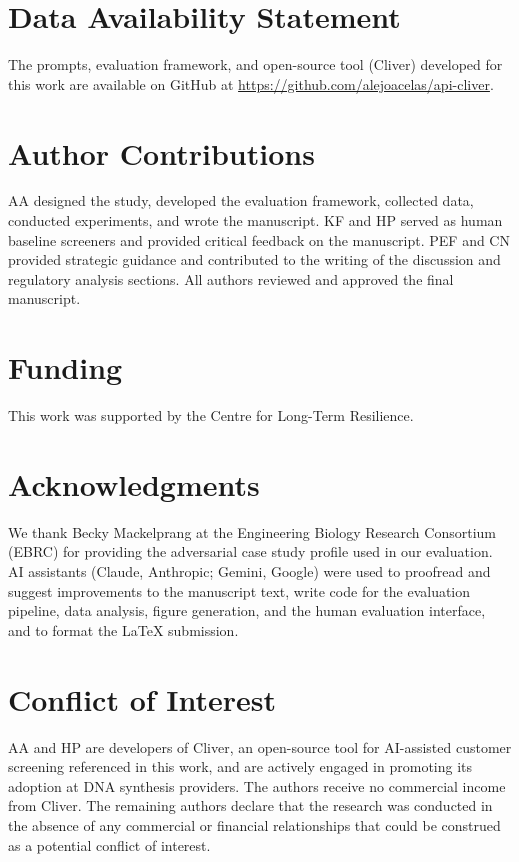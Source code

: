 \documentclass[utf8]{FrontiersinHarvard}
\begin{document}
\section*{Data Availability Statement}

The prompts, evaluation framework, and open-source tool (Cliver) developed for this work are available on GitHub at \url{https://github.com/alejoacelas/api-cliver}.

\section*{Author Contributions}

AA designed the study, developed the evaluation framework, collected data, conducted experiments, and wrote the manuscript. KF and HP served as human baseline screeners and provided critical feedback on the manuscript. PEF and CN provided strategic guidance and contributed to the writing of the discussion and regulatory analysis sections. All authors reviewed and approved the final manuscript.

\section*{Funding}

This work was supported by the Centre for Long-Term Resilience.

\section*{Acknowledgments}

We thank Becky Mackelprang at the Engineering Biology Research Consortium (EBRC) for providing the adversarial case study profile used in our evaluation. AI assistants (Claude, Anthropic; Gemini, Google) were used to proofread and suggest improvements to the manuscript text, write code for the evaluation pipeline, data analysis, figure generation, and the human evaluation interface, and to format the \LaTeX{} submission.

\section*{Conflict of Interest}

AA and HP are developers of Cliver, an open-source tool for AI-assisted customer screening referenced in this work, and are actively engaged in promoting its adoption at DNA synthesis providers. The authors receive no commercial income from Cliver. The remaining authors declare that the research was conducted in the absence of any commercial or financial relationships that could be construed as a potential conflict of interest.
\end{document}
